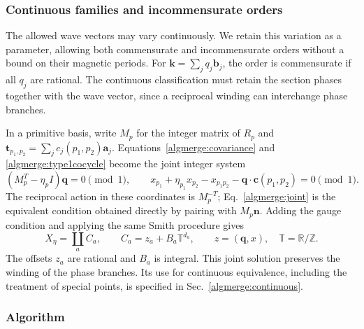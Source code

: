 \subsubsection{Continuous families and incommensurate orders}

The allowed wave vectors may vary continuously. We retain this
variation as a parameter, allowing both commensurate and
incommensurate orders without a bound on their magnetic periods.
For $\bm k=\sum_j q_j\bm b_j$, the order is commensurate if all
$q_j$ are rational. The continuous classification must retain the
section phases together with the wave vector, since a reciprocal
winding can interchange phase branches.

In a primitive basis, write $M_p$ for the integer matrix of $R_p$
and $\bm t_{p_1,p_2}=\sum_j c_j(p_1,p_2)\bm a_j$.
Equations~\eqref{algmerge:covariance} and
\eqref{algmerge:type1cocycle} become the joint integer system
\begin{equation}
 (M_p^T-\eta_p I)\bm q=0\pmod1,\qquad
 x_{p_1}+\eta_{p_1}x_{p_2}-x_{p_1p_2}
 -\bm q\cdot\bm c(p_1,p_2)=0\pmod1.
 \tag{22a}\label{algmerge:joint}
\end{equation}
The reciprocal action in these coordinates is $M_p^{-T}$;
Eq.~\eqref{algmerge:joint} is the equivalent condition obtained
directly by pairing with $M_p\bm n$. Adding the gauge condition
and applying the same Smith procedure gives
\begin{equation}
 X_\eta=\coprod_a C_a,\qquad
 C_a=z_a+B_a\mathbb T^{d_a},\qquad
 z=(\bm q,x),\quad\mathbb T=\mathbb R/\mathbb Z.
 \tag{22b}\label{algmerge:jointcomponents}
\end{equation}
The offsets $z_a$ are rational and $B_a$ is integral. This joint
solution preserves the winding of the phase branches. Its use for
continuous equivalence, including the treatment of special points,
is specified in Sec.~\ref{algmerge:continuous}.

\subsubsection{Algorithm}

